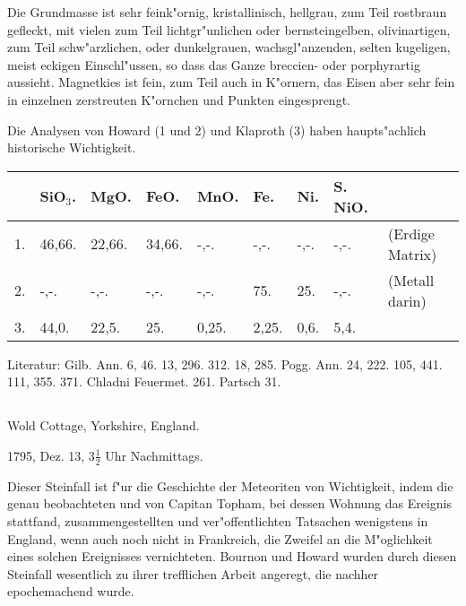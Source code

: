 \documentclass[a4paper, 11pt, oneside]{article}
\begin{document}
Die Grundmasse ist sehr feink"ornig, kristallinisch, hellgrau, zum Teil rostbraun gefleckt, mit vielen zum Teil lichtgr"unlichen oder bernsteingelben, olivinartigen, zum Teil schw"arzlichen, oder dunkelgrauen, wachsgl"anzenden, selten kugeligen, meist eckigen Einschl"ussen, so dass das Ganze breccien- oder porphyrartig aussieht. Magnetkies ist fein, zum Teil auch in K"ornern, das Eisen aber sehr fein in einzelnen zerstreuten K"ornchen und Punkten eingesprengt.

Die Analysen von Howard (1 und 2) und Klaproth (3) haben haupts"achlich historische Wichtigkeit.
\begin{table}[!ht]
    \centering\swabfamily\Large
    \begin{tabular}{l l l l l l l l l}
         & SiO$_{3}$. & MgO. & FeO. & MnO. & Fe. & Ni. & S. NiO. &  \\ \hline
        1. & 46,66. & 22,66. & 34,66. & -,-. & -,-. & -,-. & -,-. & (Erdige Matrix) \\
        2. & -,-. & -,-. & -,-. & -,-. & 75. & 25. & -,-. & (Metall darin) \\
        3. & 44,0. & 22,5. & 25. & 0,25. & 2,25. & 0,6. & 5,4. &  \\
    \end{tabular}
\end{table}

\normalsize
Literatur: Gilb. Ann. 6, 46. 13, 296. 312. 18, 285. Pogg. Ann. 24, 222. 105, 441. 111, 355. 371. Chladni Feuermet. 261. Partsch 31.
\subsection{}
\LARGE
\paragraph{}
Wold Cottage, Yorkshire, England.

1795, Dez. 13, $\mathfrak{3\frac{1}{2}}$ Uhr Nachmittags.

Dieser Steinfall ist f"ur die Geschichte der Meteoriten von Wichtigkeit, indem die genau beobachteten und von Capitan Topham, bei dessen Wohnung das Ereignis stattfand, zusammengestellten und ver"offentlichten Tatsachen wenigstens in England, wenn auch noch nicht in Frankreich, die Zweifel an die M"oglichkeit eines solchen Ereignisses vernichteten. Bournon und Howard wurden durch diesen Steinfall wesentlich zu ihrer trefflichen Arbeit angeregt, die nachher epochemachend wurde.
\end{document}
